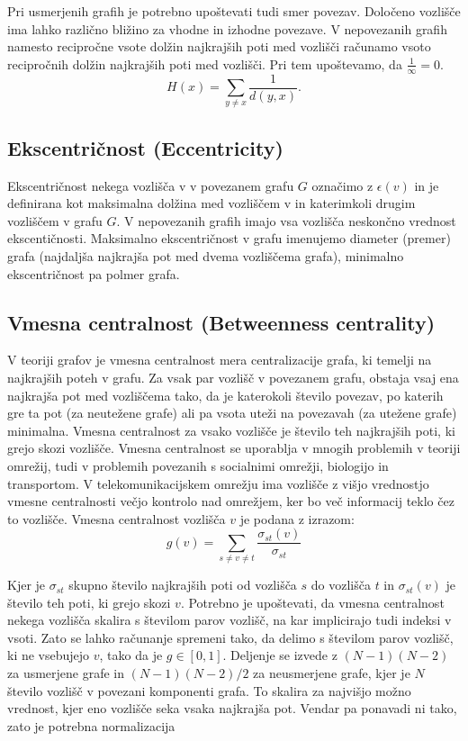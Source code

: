 \documentclass[12pt,a4paper]{amsart}
\begin{document}
Pri usmerjenih grafih je potrebno upoštevati tudi smer povezav. Določeno vozlišče ima lahko različno bližino za vhodne in izhodne povezave.
V nepovezanih grafih namesto recipročne vsote dolžin najkrajših poti med vozlišči računamo vsoto recipročnih dolžin najkrajših poti med vozlišči. Pri tem upoštevamo, da $\frac{1}{\infty} = 0.$
$$H(x) = \sum_{y \ne x}^{} \frac{1}{d(y, x)}.$$


\subsection{Ekscentričnost (Eccentricity)}
Ekscentričnost nekega vozlišča v  v povezanem grafu $G$ označimo z $\epsilon(v)$ in je definirana kot maksimalna dolžina med vozliščem v in katerimkoli drugim vozliščem v grafu $G$. V nepovezanih grafih imajo vsa vozlišča neskončno vrednost ekscentičnosti.
Maksimalno ekscentričnost v grafu imenujemo diameter (premer) grafa (najdaljša najkrajša pot med dvema vozliščema grafa), minimalno ekscentričnost pa polmer grafa.


\subsection{Vmesna centralnost (Betweenness centrality)}

V teoriji grafov je vmesna centralnost mera centralizacije grafa, ki temelji na najkrajših poteh v grafu. Za vsak par vozlišč v povezanem grafu, obstaja vsaj ena najkrajša pot med vozliščema tako, da je katerokoli število povezav, po katerih gre ta pot (za neutežene grafe) ali pa vsota uteži na povezavah (za utežene grafe) minimalna. Vmesna centralnost za vsako vozlišče je število teh najkrajših poti, ki grejo skozi vozlišče. Vmesna centralnost se uporablja v mnogih problemih v teoriji omrežij, tudi v problemih povezanih s socialnimi omrežji, biologijo in transportom. V telekomunikacijskem omrežju ima vozlišče z višjo vrednostjo vmesne centralnosti večjo kontrolo nad omrežjem, ker bo več informacij teklo čez to vozlišče. Vmesna centralnost vozlišča $v$ je podana z izrazom:
$$g(v) = \sum_{s \ne v \ne t}^{ } \frac{\sigma_{st} (v)}{\sigma_{st}}$$

Kjer je $\sigma_{st}$ skupno število najkrajših poti od vozlišča $s$ do vozlišča $t$ in $\sigma_{st} (v)$ je število teh poti, ki grejo skozi $v$. Potrebno je upoštevati, da vmesna centralnost nekega vozlišča skalira s številom parov vozlišč, na kar implicirajo tudi indeksi v vsoti. Zato se lahko računanje spremeni tako, da delimo s številom parov vozlišč, ki ne vsebujejo $v$, tako da je $g \in [0, 1]$.  Deljenje se izvede z $(N - 1)(N - 2)$ za usmerjene grafe in $(N - 1)(N - 2)/2$ za neusmerjene grafe, kjer je $N$ število vozlišč v povezani komponenti grafa. To skalira za najvišjo možno vrednost, kjer eno vozlišče seka vsaka najkrajša pot. Vendar pa ponavadi ni tako, zato je potrebna normalizacija 
\end{document}
